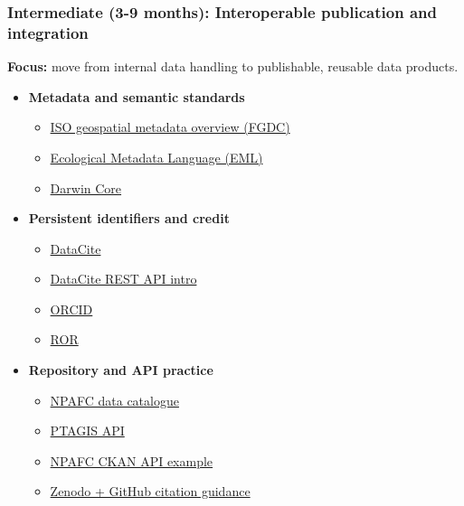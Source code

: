 \documentclass[
  letterpaper,
  DIV=11,
  numbers=noendperiod]{scrartcl}
\providecommand{\tightlist}{%
  \setlength{\itemsep}{0pt}\setlength{\parskip}{0pt}}
\begin{document}
\subsubsection{Intermediate (3-9 months): Interoperable publication and
integration}\label{intermediate-3-9-months-interoperable-publication-and-integration}

\textbf{Focus:} move from internal data handling to publishable,
reusable data products.

\begin{itemize}
\tightlist
\item
  \textbf{Metadata and semantic standards}

  \begin{itemize}
  \tightlist
  \item
    \href{https://www.fgdc.gov/metadata/iso-standards}{ISO geospatial
    metadata overview (FGDC)}
  \item
    \href{https://eml.ecoinformatics.org/}{Ecological Metadata Language
    (EML)}
  \item
    \href{https://dwc.tdwg.org/}{Darwin Core}
  \end{itemize}
\item
  \textbf{Persistent identifiers and credit}

  \begin{itemize}
  \tightlist
  \item
    \href{https://datacite.org}{DataCite}
  \item
    \href{https://support.datacite.org/docs/api}{DataCite REST API
    intro}
  \item
    \href{https://orcid.org/}{ORCID}
  \item
    \href{https://ror.org/}{ROR}
  \end{itemize}
\item
  \textbf{Repository and API practice}

  \begin{itemize}
  \tightlist
  \item
    \href{https://data.npafc.org}{NPAFC data catalogue}
  \item
    \href{https://api.ptagis.org/index.html}{PTAGIS API}
  \item
    \href{https://data.npafc.org/api/3/action/package_search?q=salmon}{NPAFC
    CKAN API example}
  \item
    \href{https://docs.github.com/en/repositories/archiving-a-github-repository/referencing-and-citing-content}{Zenodo
    + GitHub citation guidance}
  \end{itemize}
\end{itemize}
\end{document}
